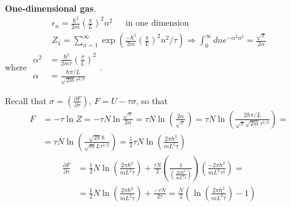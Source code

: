  \textbf{One-dimensional gas}.  
\[
\begin{gathered}
  \epsilon_n = \frac{\hbar^2}{2m} \left( \frac{\pi}{L} \right)^2 n^2 \quad \, \text{ in one dimension } \\ 
  Z_1 = \sum_{n=1}^{ \infty} \exp{ \left( \frac{-\hbar^2}{2m} \left( \frac{\pi}{L} \right)^2 n^2/\tau \right) } \Longrightarrow \int_0^{\infty} dn e^{-\alpha^2 n ^2}  = \frac{\sqrt{\pi}}{2 \alpha}
\end{gathered}
\]
where $\begin{aligned} \alpha^2 & = \frac{\hbar^2}{2 m \tau} \left( \frac{\pi}{L} \right)^2 \\ \alpha & = \frac{\hbar \pi /L }{ \sqrt{2m } \tau^{1/2 } } \end{aligned}$.  

Recall that $\sigma= \left( \frac{ \partial F}{\partial \tau} \right)$, $F = U- \tau \sigma$, so that 
\[
\begin{aligned}
  F & = -\tau \ln{Z} = -\tau N \ln{ \frac{\sqrt{\pi}}{ 2 \alpha} } = \tau N \ln{ \left( \frac{2\alpha }{\sqrt{\pi}} \right) } = \tau N \ln{ \left( \frac{ 2 \hbar \pi/L }{ \sqrt{\pi} \sqrt{ 2m} \tau^{1/2} } \right) } = \\
  & = \tau N \ln{ \left( \frac{ \sqrt{2\pi } \hbar}{ \sqrt{m} L \tau^{1/2} } \right) } = \frac{1}{2} \tau N \ln{ \left( \frac{ 2\pi \hbar^2 }{ mL^2 \tau} \right) }
\end{aligned}
\]
\[
\begin{aligned}
  \frac{ \partial F}{\partial \tau} & = \frac{1}{2} N \ln{\left( \frac{2\pi \hbar^2}{mL^2 \tau} \right)} + \frac{\tau N}{2} \left( \frac{1}{ \left( \frac{2\pi \hbar^2}{mL^2 \tau} \right) } \right) \left( \frac{-2\pi \hbar^2 }{mL^2 \tau^2 } \right) = \\
    & = \frac{1}{2} N \ln{\left( \frac{2\pi \hbar^2}{mL^2 \tau} \right) } + \frac{-\tau N}{2\tau} = \boxed{ \frac{N}{2} \left(\ln{ \left( \frac{2\pi \hbar^2}{mL^2 \tau} \right) } - 1 \right) }
\end{aligned}
\]

